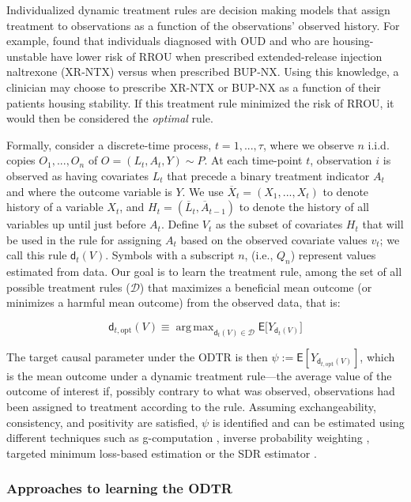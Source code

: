 \documentclass[11pt]{article}
\DeclareMathOperator*{\argmax}{arg\,max}
\renewcommand{\d}{\mathsf{d}}
\newcommand{\E}{\mathsf{E}}
\begin{document}
Individualized dynamic treatment rules are decision making models that assign treatment to observations as a function of the observations' observed history. For example, \citep{} found that individuals diagnosed with OUD and who are housing-unstable have lower risk of RROU when prescribed extended-release injection naltrexone (XR-NTX) versus when prescribed BUP-NX. Using this knowledge, a clinician may choose to prescribe XR-NTX or BUP-NX as a function of their patients housing stability. If this treatment rule minimized the risk of RROU, it would then be considered the \textit{optimal} rule.

Formally, consider a discrete-time process, $t = 1, ..., \tau$, where we observe $n$ i.i.d. copies $O_1, ..., O_n$ of $O = (L_t, A_t, Y) \sim P$. At each time-point $t$, observation $i$ is observed as having covariates $L_t$ that precede a binary treatment indicator $A_t$ and where the outcome variable is $Y$. We use $\overline{X}_t = (X_1, ..., X_t)$ to denote history of a variable $X_t$, and $H_t = (\overline{L}_t, \overline{A}_{t-1})$ to denote the history of all variables up until just before $A_t$. Define $V_t$ as the subset of covariates $H_t$ that will be used in the rule for assigning $A_t$ based on the observed covariate values $v_t$; we call this rule $\d_t(V)$. Symbols with a subscript $n$, (i.e., $Q_n$) represent values estimated from data. Our goal is to learn the treatment rule, among the set of all possible treatment rules ($\mathcal{D}$) that maximizes a beneficial mean outcome (or minimizes a harmful mean outcome) from the observed data, that is: 

$$
\d_{t, \text{opt}}(V) \equiv \argmax _{\d_t(V) \in \mathcal{D}} \E \Big[ Y_{\d_t(V)} \Big]
$$

The target causal parameter under the ODTR is then $\psi := \E[Y_{\d_{t, \text{opt}}(V)}]$, which is the mean outcome under a dynamic treatment rule---the average value of the outcome of interest if, possibly contrary to what was observed, observations had been assigned to treatment according to the rule. Assuming exchangeability, consistency, and positivity are satisfied, $\psi$ is identified and can be estimated using different techniques such as g-computation \citep{}, inverse probability weighting \citep{}, targeted minimum loss-based estimation \citep{tmleLong} or the SDR estimator \cite{luedtke2018sequential}. 

\subsubsection{Approaches to learning the ODTR}
\end{document}
